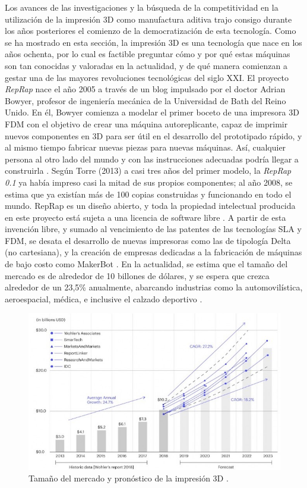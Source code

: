 Los avances de las investigaciones y la búsqueda de la competitividad en la utilización de la impresión 3D como  manufactura aditiva trajo consigo durante los años posteriores el comienzo de la democratización de esta tecnología. Como se ha mostrado en esta sección, la impresión 3D es una tecnología que nace en los años ochenta, por lo cual es factible preguntar cómo y por qué estas máquinas son tan conocidas y valoradas en la actualidad, y de qué manera comienzan a gestar una de las mayores revoluciones tecnológicas del siglo XXI. El proyecto \textit{RepRap} nace el año 2005 a través de un blog impulsado por el doctor Adrian Bowyer, profesor de ingeniería mecánica de la Universidad de Bath del Reino Unido. En él, Bowyer comienza a modelar el primer boceto de una impresora 3D FDM con el objetivo de crear una máquina autoreplicante, capaz de imprimir nuevos componentes en 3D para ser útil en el desarrollo del prototipado rápido, y al mismo tiempo fabricar nuevas piezas para nuevas máquinas. Así, cualquier persona al otro lado del mundo y con las instrucciones adecuadas podría llegar a construirla  \parencite{torre2013}. Según Torre (2013) a casi tres años del primer modelo, la \textit{RepRap 0.1} ya había impreso casi la mitad de sus propios componentes; al año 2008, se estima que ya existían más de 100 copias construidas y funcionando en todo el mundo. RepRap es un diseño abierto, y toda la propiedad intelectual producida en este proyecto está sujeta a una licencia de software libre \parencite{alltresdp2016}. A partir de esta invención libre, y sumado al vencimiento de las patentes de las tecnologías SLA y FDM, se desata el desarrollo de nuevas impresoras como las de tipología Delta (no cartesiana), y la creación de empresas dedicadas a la fabricación de máquinas de bajo costo como MakerBot \parencite{tresdsourced2020}. En la actualidad, se estima que el tamaño del mercado es de alrededor de 10 billones de dólares, y se espera que crezca alrededor de un 23,5\% anualmente, abarcando industrias como la automovilística, aeroespacial, médica, e inclusive el calzado deportivo \parencite{donovan2019}.

\begin{figure}[H]
\centering
\includegraphics[scale=0.8]{images/3dmarket.png}
\caption{Tamaño del mercado y pronóstico de la impresión 3D \parencite{donovan2019}.}

\end{figure}

